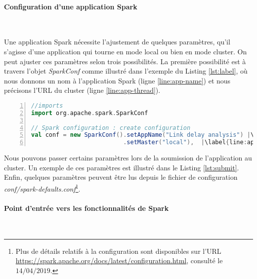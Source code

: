 \paragraph{Configuration d'une application  Spark}~

Une application Spark nécessite l'ajustement de quelques paramètres, qu'il s'agisse d'une application qui tourne en mode local ou bien en mode cluster. 
 On peut ajuster ces paramètres selon trois possibilités. La première possibilité est à travers l'objet \textit{SparkConf} comme illustré dans l'exemple du Listing \ref{lst:label}, où nous donnons un nom à l'application Spark (ligne \ref{line:app-name}) et nous précisons l'URL du cluster (ligne \ref{line:app-thread}). 

\begin{lstlisting}[language=scala,firstnumber=1, caption={Exemple de la configuration d'une application Spark via l'objet SparkConf},label={lst:label}, basicstyle = \footnotesize,escapechar=|,numbers=left,
stepnumber=1,numberstyle=\scriptsize]
//imports
import org.apache.spark.SparkConf

// Spark configuration : create configuration
val conf = new SparkConf().setAppName("Link delay analysis") |\label{line:app-name}|
                          .setMaster("local"),  |\label{line:app-thread}|
\end{lstlisting}

Nous pouvons passer certains paramètres lors de la soumission de l'application au cluster.  Un exemple de ces paramètres est illustré dans le Listing \ref{lst:submit}. Enfin, quelques paramètres peuvent être lus depuis le fichier de configuration  \textit{conf/spark-defaults.conf}\footnote{Plus de détails relatifs à la configuration sont disponibles sur l'URL  \url{https://spark.apache.org/docs/latest/configuration.html}, consulté le $14/04/2019$.}. 





\paragraph{Point d'entrée vers les fonctionnalités de Spark}~

